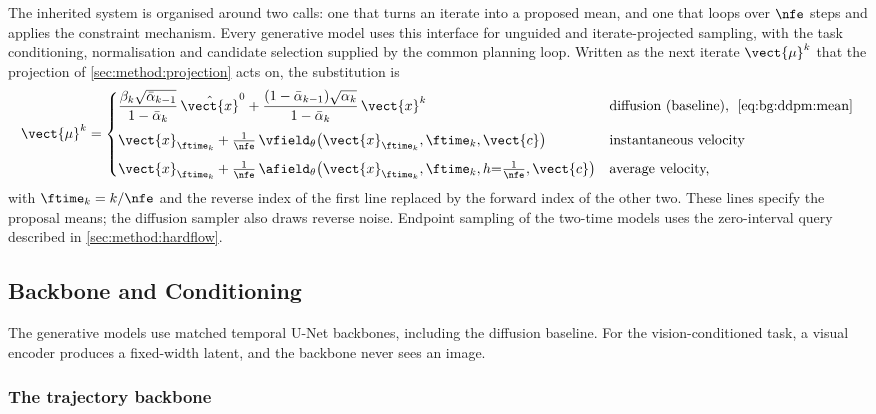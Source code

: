 The inherited system is organised around two calls: one that turns an iterate into a proposed
mean, and one that loops over $\nfe$ steps and applies the constraint mechanism. Every generative model
uses this interface for unguided and iterate-projected sampling, with the task
conditioning, normalisation and candidate selection supplied by the common planning loop. Written as the next iterate $\vect{\mu}^{k}$ that the projection of
\autoref{sec:method:projection} acts on, the substitution is
\begin{equation}\label{eq:method:engine:iface}
  \vect{\mu}^{k}
  = \begin{cases}
      \dfrac{\beta_{k}\sqrt{\bar{\alpha}_{k-1}}}{1-\bar{\alpha}_{k}}\,\hat{\vect{x}}^{0}
        + \dfrac{(1-\bar{\alpha}_{k-1})\sqrt{\alpha_{k}}}{1-\bar{\alpha}_{k}}\,\vect{x}^{k}
        & \text{diffusion (baseline),\; \eqref{eq:bg:ddpm:mean}}\\[10pt]
      \vect{x}_{\ftime_{k}} + \tfrac{1}{\nfe}\,
        \vfield_{\theta}\!\left(\vect{x}_{\ftime_{k}},\ftime_{k},\vect{c}\right)
        & \text{instantaneous velocity}\\[6pt]
      \vect{x}_{\ftime_{k}} + \tfrac{1}{\nfe}\,
        \afield_{\theta}\!\left(\vect{x}_{\ftime_{k}},\ftime_{k},h{=}\tfrac{1}{\nfe},\vect{c}\right)
        & \text{average velocity,}
    \end{cases}
\end{equation}
with $\ftime_{k} = k/\nfe$ and the reverse index of the first line replaced by the forward index
of the other two. These lines specify the proposal means; the diffusion sampler also draws reverse
noise. Endpoint sampling of the two-time models uses the zero-interval query described in
\autoref{sec:method:hardflow}.

\subsection{Backbone and Conditioning}\label{sec:method:backbone}

The generative models use matched temporal U-Net backbones, including the diffusion baseline. For the vision-conditioned task, a visual encoder produces a fixed-width latent, and the
backbone never sees an image.

\subsubsection*{The trajectory backbone}

